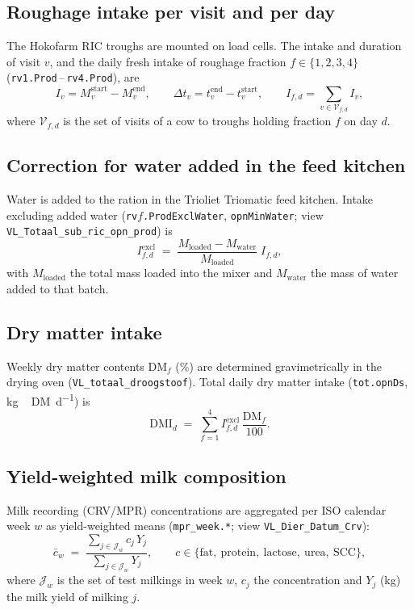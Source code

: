 \documentclass[10pt,a4paper]{article}
\begin{document}
\subsection{Roughage intake per visit and per day}
The Hokofarm RIC troughs are mounted on load cells. The intake and duration of
visit $v$, and the daily fresh intake of roughage fraction
$f \in \{1,2,3,4\}$ (\texttt{rv1.Prod}\,--\,\texttt{rv4.Prod}), are
\begin{equation}
  I_{v} = M_{v}^{\text{start}} - M_{v}^{\text{end}}, \qquad
  \Delta t_{v} = t_{v}^{\text{end}} - t_{v}^{\text{start}}, \qquad
  I_{f,d} = \sum_{v \in \mathcal{V}_{f,d}} I_{v},
  \label{eq:ric}
\end{equation}
where $\mathcal{V}_{f,d}$ is the set of visits of a cow to troughs holding
fraction $f$ on day $d$.

\subsection{Correction for water added in the feed kitchen}
Water is added to the ration in the Trioliet Triomatic feed kitchen. Intake
excluding added water (\texttt{rv$f$.ProdExclWater}, \texttt{opnMinWater};
view \texttt{VL\_Totaal\_sub\_ric\_opn\_prod}) is
\begin{equation}
  I_{f,d}^{\text{excl}} \;=\;
  \frac{M_{\text{loaded}} - M_{\text{water}}}{M_{\text{loaded}}}\; I_{f,d},
  \label{eq:water}
\end{equation}
with $M_{\text{loaded}}$ the total mass loaded into the mixer and
$M_{\text{water}}$ the mass of water added to that batch.

\subsection{Dry matter intake}
Weekly dry matter contents $\mathrm{DM}_{f}$ (\si{\percent}) are determined
gravimetrically in the drying oven (\texttt{VL\_totaal\_droogstoof}). Total
daily dry matter intake (\texttt{tot.opnDs}, \si{\kilogram\,DM\per\day}) is
\begin{equation}
  \mathrm{DMI}_{d} \;=\; \sum_{f=1}^{4} I_{f,d}^{\text{excl}}\,
  \frac{\mathrm{DM}_{f}}{100}.
  \label{eq:dmi}
\end{equation}

\subsection{Yield-weighted milk composition}
Milk recording (CRV/MPR) concentrations are aggregated per ISO calendar week $w$
as yield-weighted means (\texttt{mpr\_week.*}; view \texttt{VL\_Dier\_Datum\_Crv}):
\begin{equation}
  \bar{c}_{w} \;=\;
  \frac{\displaystyle\sum_{j \in \mathcal{J}_{w}} c_{j}\, Y_{j}}
       {\displaystyle\sum_{j \in \mathcal{J}_{w}} Y_{j}},
  \qquad c \in \{\text{fat},\ \text{protein},\ \text{lactose},\ \text{urea},\ \text{SCC}\},
  \label{eq:mpr}
\end{equation}
where $\mathcal{J}_{w}$ is the set of test milkings in week $w$, $c_{j}$ the
concentration and $Y_{j}$ (\si{\kilogram}) the milk yield of milking $j$.
\end{document}
